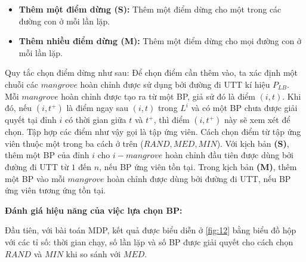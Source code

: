 \documentclass[../main.tex]{subfiles}
\begin{document}
\begin{itemize}
\tightlist
\item
  \textbf{Thêm một điểm dừng (S):} Thêm một điểm dừng cho một trong các
  đường con ở mỗi lần lặp.
\item
  \textbf{Thêm nhiều điểm dừng (M):} Thêm một điểm dừng cho mọi đường
  con ở mỗi lần lặp.
\end{itemize}

Quy tắc chọn điểm dừng như sau: Để chọn điểm cần thêm vào, ta xác định
một chuỗi các \(mangrove\) hoàn chỉnh được sử dụng bởi đường đi UTT kí
hiệu \(P_{LB}\). Mỗi \(mangrove\) hoàn chỉnh được tạo ra từ một BP, giả
sử đó là điểm \((i,t)\). Khi đó, nếu \((i,t^+)\) là điểm ngay sau
\((i,t)\) trong \(L^i\) và có một BP chưa được giải quyết tại đỉnh \(i\)
có thời gian giữa \(t\) và \(t^+\), thì điểm \((i,t^+)\) này sẽ xem xét
để chọn. Tập hợp các điểm như vậy gọi là tập ứng viên. Cách chọn điểm từ
tập ứng viên thuộc một trong ba cách ở trên (\(RAND, MED, MIN\)). Với
kịch bản \textbf{(S)}, thêm một BP của đỉnh \(i\) cho \(i-mangrove\)
hoàn chỉnh đầu tiên được dùng bởi đường đi UTT từ \(1\) đến \(n\), nếu
BP ứng viên tồn tại. Trong kịch bản \textbf{(M)}, thêm một BP vào mỗi
\(mangrove\) hoàn chỉnh được dùng bởi đường đi UTT, nếu BP ứng viên
tương ứng tồn tại.

\textbf{Đánh giá hiệu năng của việc lựa chọn BP:}

Đầu tiên, với bài toán MDP, kết quả được biểu diễn ở \autoref{fig:12} bằng biểu
đồ hộp với các tỉ số: thời gian chạy, số lần lặp và số BP được giải
quyết cho cách chọn \(RAND\) và \(MIN\) khi so sánh với \(MED\).

\end{document}
